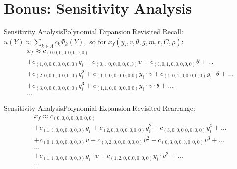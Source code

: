 \documentclass{beamer}
\begin{document}
\section{Bonus: Sensitivity Analysis}
\begin{frame}{Sensitivity Analysis}{Polynomial Expansion Revisited}\vspace{-30pt}
Recall: $u(Y)\approx\sum_{k\in\Lambda}c_k\Phi_k(Y),$ so for $x_f(y_i,v,\theta,g,m,r,C,\rho)$:
\begin{align*}
&x_f \approx c_{(0,0,0,0,0,0,0,0)} \\
 &+c_{(1,0,0,0,0,0,0,0)}y_i + c_{(0,1,0,0,0,0,0,0)}v + c_{(0,0,1,0,0,0,0,0)}\theta+\ldots\\
 &+c_{(2,0,0,0,0,0,0,0)}y_i^2 + c_{(1,1,0,0,0,0,0,0)}y_i\cdot v + c_{(1,0,1,0,0,0,0,0)}y_i\cdot \theta +\ldots\\
 &+c_{(3,0,0,0,0,0,0,0)}y_i^3 + c_{(1,1,0,0,0,0,0,0)}y_i\cdot v\cdot\theta +\ldots\\
 &\ldots
\end{align*}
\end{frame}

\begin{frame}{Sensitivity Analysis}{Polynomial Expansion Revisited}\vspace{-30pt}
Rearrange:
\begin{align*}
&x_f \approx c_{(0,0,0,0,0,0,0,0)} \\
 &+c_{(1,0,0,0,0,0,0,0)}y_i + c_{(2,0,0,0,0,0,0,0)}y_i^2 + c_{(3,0,0,0,0,0,0,0)}y_i^3+\ldots\\
 &+c_{(0,1,0,0,0,0,0,0)}v + c_{(0,2,0,0,0,0,0,0)}v^2 + c_{(0,3,0,0,0,0,0,0)}v^3+\ldots\\
 &\ldots\\
 &+c_{(1,1,0,0,0,0,0,0)}y_i\cdot v + c_{(1,2,0,0,0,0,0,0)}y_i\cdot v^2+\ldots\\
 &\ldots
\end{align*}
\end{frame}
\end{document}
